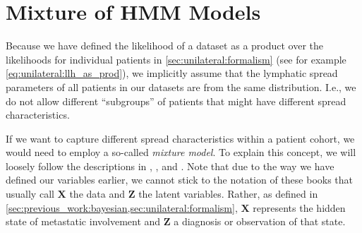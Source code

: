 \documentclass[\relativeRoot/main.tex]{subfiles}
\begin{document}
\section{Mixture of HMM Models}
\label{sec:future:mixture}

Because we have defined the likelihood of a dataset as a product over the likelihoods for individual patients in \cref{sec:unilateral:formalism} (see for example \cref{eq:unilateral:llh_as_prod}), we implicitly assume that the lymphatic spread parameters of all patients in our datasets are from the same distribution. I.e., we do not allow different ``subgroups'' of patients that might have different spread characteristics.

If we want to capture different spread characteristics within a patient cohort, we would need to employ a so-called \emph{mixture model}. To explain this concept, we will loosely follow the descriptions in , , and . Note that due to the way we have defined our variables earlier, we cannot stick to the notation of these books that usually call $\mathbf{X}$ the data and $\mathbf{Z}$ the latent variables. Rather, as defined in \cref{sec:previous_work:bayesian,sec:unilateral:formalism}, $\mathbf{X}$ represents the hidden state of metastatic involvement and $\mathbf{Z}$ a diagnosis or observation of that state.
\end{document}
